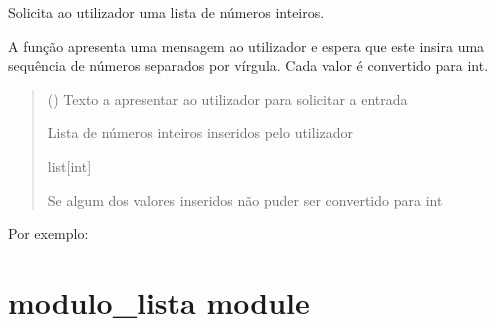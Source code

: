 \documentclass[letterpaper,10pt,portuges]{sphinxmanual}
\begin{document}
\begin{fulllineitems}
\label{\detokenize{main:main.pedir_lista_inteiros}}
\pysigstartsignatures
\pysiglinewithargsret
{}
{}
{}
\pysigstopsignatures
\sphinxAtStartPar
Solicita ao utilizador uma lista de números inteiros.

\sphinxAtStartPar
A função apresenta uma mensagem ao utilizador e espera que este
insira uma sequência de números separados por vírgula. Cada valor
é convertido para int.
\begin{quote}\begin{description}
\sphinxAtStartPar
{} () \textendash{} Texto a apresentar ao utilizador para solicitar a entrada

\sphinxAtStartPar
Lista de números inteiros inseridos pelo utilizador

\sphinxAtStartPar
list{[}int{]}

\sphinxAtStartPar
{} \textendash{} Se algum dos valores inseridos não puder ser
convertido para int

\end{description}\end{quote}

\sphinxAtStartPar
Por exemplo:

\begin{sphinxVerbatim}[commandchars=\\\{\}]
\end{sphinxVerbatim}

\end{fulllineitems}


\sphinxstepscope


\chapter{modulo\_lista module}
\label{\detokenize{modulo_lista:module-modulo_lista}}\label{\detokenize{modulo_lista:modulo-lista-module}}\label{\detokenize{modulo_lista::doc}}
\end{document}
